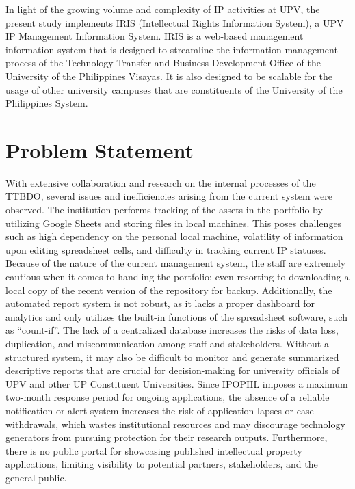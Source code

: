 In light of the growing volume and complexity of IP activities at UPV, the present study implements IRIS (Intellectual Rights Information System), a UPV IP Management Information System. IRIS is a web-based management information system that is designed to streamline the information management process of the Technology Transfer and Business Development Office of the University of the Philippines Visayas. It is also designed to be scalable for the usage of other university campuses that are constituents of the University of the Philippines System.

\section{Problem Statement}

With extensive collaboration and research on the internal processes of the TTBDO, several issues and inefficiencies arising from the current system were observed. The institution performs tracking of the assets in the portfolio by utilizing Google Sheets and storing files in local machines. This poses challenges such as high dependency on the personal local machine, volatility of information upon editing spreadsheet cells, and difficulty in tracking current IP statuses. Because of the nature of the current management system, the staff are extremely cautious when it comes to handling the portfolio; even resorting to downloading a local copy of the recent version of the repository for backup. Additionally, the automated report system is not robust, as it lacks a proper dashboard for analytics and only utilizes the built-in functions of the spreadsheet software, such as “count-if”. The lack of a centralized database increases the risks of data loss, duplication, and miscommunication among staff and stakeholders. Without a structured system, it may also be difficult to monitor and generate summarized descriptive reports that are crucial for decision-making for university officials of UPV and other UP Constituent Universities. Since IPOPHL imposes a maximum two-month response period for ongoing applications, the absence of a reliable notification or alert system increases the risk of application lapses or case withdrawals, which wastes institutional resources and may discourage technology generators from pursuing protection for their research outputs. Furthermore, there is no public portal for showcasing published intellectual property applications, limiting visibility to potential partners, stakeholders, and the general public.

